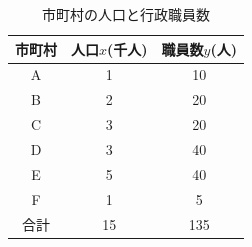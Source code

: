 \documentclass[12pt]{jarticle}
\begin{document}
\begin{table}[htb]
    \begin{center}
        \caption{市町村の人口と行政職員数}
        \begin{tabular}{|c|c|c|} \hline
            市町村 & 人口$x$(千人) & 職員数$y$(人) \\ \hline
            A      & 1             & 10            \\
            B      & 2             & 20            \\
            C      & 3             & 20            \\
            D      & 3             & 40            \\
            E      & 5             & 40            \\
            F      & 1             & 5             \\ \hline
            合計   & 15            & 135           \\\hline
        \end{tabular}
    \end{center}
\end{table}
\end{document}

